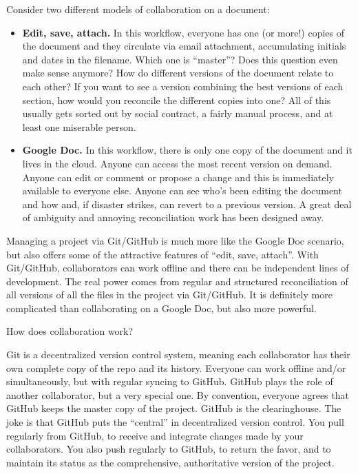 \documentclass[12pt]{article}
\begin{document}
Consider two different models of collaboration on a document:

\begin{itemize}
\item
  \textbf{Edit, save, attach.} In this workflow, everyone has one (or
  more!) copies of the document and they circulate via email attachment,
  accumulating initials and dates in the filename. Which one is
  ``master''? Does this question even make sense anymore? How do
  different versions of the document relate to each other? If you want
  to see a version combining the best versions of each section, how
  would you reconcile the different copies into one? All of this usually
  gets sorted out by social contract, a fairly manual process, and at
  least one miserable person.
\item
  \textbf{Google Doc.} In this workflow, there is only one copy of the
  document and it lives in the cloud. Anyone can access the most recent
  version on demand. Anyone can edit or comment or propose a change and
  this is immediately available to everyone else. Anyone can see who's
  been editing the document and how and, if disaster strikes, can revert
  to a previous version. A great deal of ambiguity and annoying
  reconciliation work has been designed away.
\end{itemize}

Managing a project via Git/GitHub is much more like the Google Doc
scenario, but also offers some of the attractive features of ``edit,
save, attach''. With Git/GitHub, collaborators can work offline and
there can be independent lines of development. The real power comes from
regular and structured reconciliation of all versions of all the files
in the project via Git/GitHub. It is definitely more complicated than
collaborating on a Google Doc, but also more powerful.

How does collaboration work?

Git is a decentralized version control system, meaning each collaborator
has their own complete copy of the repo and its history. Everyone can
work offline and/or simultaneously, but with regular syncing to GitHub.
GitHub plays the role of another collaborator, but a very special one.
By convention, everyone agrees that GitHub keeps the master copy of the
project. GitHub is the clearinghouse. The joke is that GitHub puts the
``central'' in decentralized version control. You pull regularly from
GitHub, to receive and integrate changes made by your collaborators. You
also push regularly to GitHub, to return the favor, and to maintain its
status as the comprehensive, authoritative version of the project.
\end{document}
